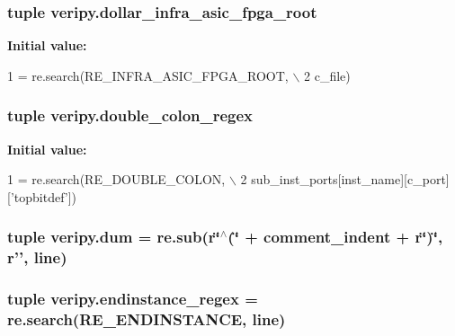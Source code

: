 \hypertarget{namespaceveripy_a20c975857dc6d80de2866942e40e05f5}{
\subsubsection[{dollar\-\_\-infra\-\_\-asic\-\_\-fpga\-\_\-root}]{\setlength{\rightskip}{0pt plus 5cm}tuple veripy.\-dollar\-\_\-infra\-\_\-asic\-\_\-fpga\-\_\-root}}\label{namespaceveripy_a20c975857dc6d80de2866942e40e05f5}
{\bfseries Initial value\-:}
\begin{DoxyCode}
1 = re.search(RE\_INFRA\_ASIC\_FPGA\_ROOT, \(\backslash\)
2                     c\_file)
\end{DoxyCode}
\hypertarget{namespaceveripy_aef963574b2302ef9e877156896ba492c}{
\subsubsection[{double\-\_\-colon\-\_\-regex}]{\setlength{\rightskip}{0pt plus 5cm}tuple veripy.\-double\-\_\-colon\-\_\-regex}}\label{namespaceveripy_aef963574b2302ef9e877156896ba492c}
{\bfseries Initial value\-:}
\begin{DoxyCode}
1 = re.search(RE\_DOUBLE\_COLON, \(\backslash\)
2                                 sub\_inst\_ports[inst\_name][c\_port][\textcolor{stringliteral}{'topbitdef'}])
\end{DoxyCode}
\hypertarget{namespaceveripy_a10641579d50981ec799455035259addc}{
\subsubsection[{dum}]{\setlength{\rightskip}{0pt plus 5cm}tuple veripy.\-dum = re.\-sub(r\char`\"{}$^\wedge$(\char`\"{} + {\bf comment\-\_\-indent} + r\char`\"{})\char`\"{}, r'', {\bf line})}}\label{namespaceveripy_a10641579d50981ec799455035259addc}
\hypertarget{namespaceveripy_ace16773ac50b8685d48f7b5c063e3c18}{
\subsubsection[{endinstance\-\_\-regex}]{\setlength{\rightskip}{0pt plus 5cm}tuple veripy.\-endinstance\-\_\-regex = re.\-search(R\-E\-\_\-\-E\-N\-D\-I\-N\-S\-T\-A\-N\-C\-E, {\bf line})}}\label{namespaceveripy_ace16773ac50b8685d48f7b5c063e3c18}
